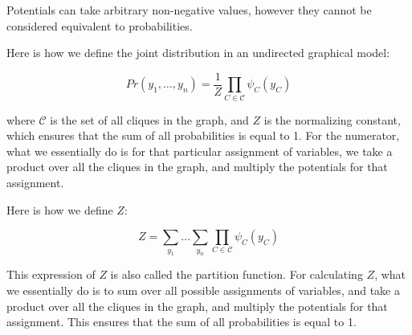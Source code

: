 \documentclass[a4paper]{article}
\begin{document}
Potentials can take arbitrary non-negative values, however they cannot be considered equivalent to probabilities. 

Here is how we define the joint distribution in an undirected graphical model:

\[
Pr(y_1, \dots, y_n) = \frac{1}{Z} \prod_{C \in \mathcal{C}} \psi_C(y_C)
\]

where $\mathcal{C}$ is the set of all cliques in the graph, and $Z$ is the normalizing constant, which ensures that the sum of all probabilities is equal to 1. For the numerator, what we essentially do is for that particular assignment of variables, we take a product over all the cliques in the graph, and multiply the potentials for that assignment.

Here is how we define $Z$:

\[
Z = \sum_{y_1} \dots \sum_{y_n} \prod_{C \in \mathcal{C}} \psi_C(y_C)
\]

This expression of $Z$ is also called the partition function. For calculating $Z$, what we essentially do is to sum over all possible assignments of variables, and take a product over all the cliques in the graph, and multiply the potentials for that assignment. This ensures that the sum of all probabilities is equal to 1.
\end{document}
